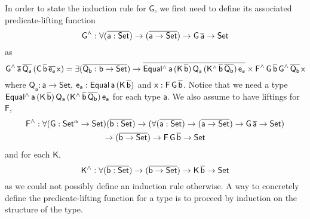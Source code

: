 \documentclass[acmsmall,screen,review,anonymous]{acmart}
\theoremstyle{definition}
\begin{document}
In order to state the induction rule for $\mathsf{G}$,
we first need to define its associated predicate-lifting function 
\[
\mathsf{G^{\wedge} : \forall (\overline{a : Set}) \to (\overline{a \to Set}) \to G\,\overline{a} \to Set}
\]
as
\[
\mathsf{G^{\wedge}\,\overline{a}\,\overline{Q_a}\,(C\,\overline{b}\,\overline{e_a}\,x)
= \exists (\overline{Q_b : b \to Set})
\to \overline{Equal^{\wedge}\,a\,(K\,\overline{b})\,Q_a\,(K^{\wedge}\,\overline{b}\,\overline{Q_b})\,e_a}
\times F^{\wedge}\,G\,\overline{b}\,G^{\wedge}\,{\overline{Q_b}}\,x}
\]
where $\mathsf{Q_a : a \to Set}$, $\mathsf{e_a : Equal\,a\,(K\,\overline{b})}$ and $\mathsf{x : F\,G\,\overline{b}}$.
Notice that we need a type $\mathsf{Equal^{\wedge}\,a\,(K\,\overline{b})\,Q_a\,(K^{\wedge}\,\overline{b}\,\overline{Q_b})\,e_a}$
for each type $\mathsf{a}$.
We also assume to have liftings for $\mathsf{F}$,
\begin{multline*}
\mathsf{F^{\wedge} : \forall (G : Set^{\alpha} \to Set) (\overline{b : Set})
\to (\forall (\overline{a : Set}) \to (\overline{a \to Set}) \to G\,\overline{a} \to Set)} \\
\mathsf{\to (\overline{b \to Set})
\to F\,G\,\overline{b} \to Set}
\end{multline*}
and for each  $\mathsf{K}$,
\[
\mathsf{K^{\wedge} : \forall (\overline{b : Set}) \to (\overline{b \to Set}) \to K\,\overline{b} \to Set}
\]
as we could not possibly define an induction rule otherwise.
A way to concretely define the predicate-lifting function for a type is to proceed by induction on the structure of the type.


\end{document}
